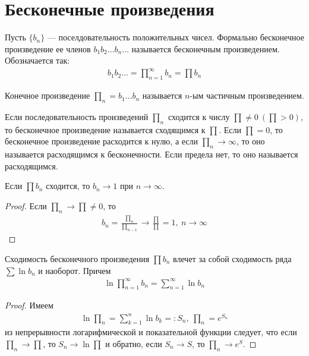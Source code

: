 \section{Бесконечные произведения}
\begin{definition}
  Пусть $\{b_n\}$ --- поселдовательность положительных чисел. Формально
  бесконечное произведение ее членов $b_1b_2\dots b_n\dots$ называется
  бесконечным произведением. Обозначается так:
  \begin{gather*}
    b_1b_2\dots = \prod\limits_{n = 1}^\infty b_n = \prod b_n
  \end{gather*}
\end{definition}

\begin{definition}
  Конечное произведение ${\prod}_n = b_1\dots b_n$ называется $n$-ым
  частичным произведением.
\end{definition}

\begin{definition}
  Если последовательность произведений ${\prod}_n$ сходится к числу $\prod \not =
  0 \ (\prod > 0)$, то бесконечное произведение называется сходящимся к
  $\prod$. Если $\prod = 0$, то бесконечное произведение расходится к нулю, а
  если $\prod_n \to \infty$, то оно называется расходящимся к бесконечности.
  Если предела нет, то оно называется расходящимся.
\end{definition}

\begin{approval}
  Если $\prod b_n$ сходится, то $b_n \to 1$ при $n \to \infty$.
\end{approval}

\begin{proof}
  Если $\prod_n \to \prod \not = 0$, то
  \begin{gather*}
    b_n = \frac{{\prod}_n}{{\prod}_{n-1}} \to
    \frac{\prod}{\prod} = 1, \ n \to \infty
  \end{gather*}
\end{proof}

\begin{approval}
  Сходимость бесконечного произведения $\prod b_n$ влечет за собой сходимость
  ряда $\sum \ln b_n$ и наоборот. Причем
  \begin{gather*}
    \ln \prod\limits_{n = 1}^\infty b_n = \sum\limits_{n = 1}^{\infty} \ln b_n
  \end{gather*}
\end{approval}

\begin{proof}
  Имеем
  \begin{gather}
    \ln {\prod}_n = \sum\limits_{k = 1}^{n} \ln b_k =: S_n, \ {\prod}_n = e^{S_n}
    \label{app912:eq1}
  \end{gather}
  из непрерывности логарифмической и показательной функции следует, что если
  ${\prod}_n \to \prod$, то $S_n \to \ln \prod$ и обратно, если $S_n \to S$, то
  ${\prod}_n \to e^{S}$.
\end{proof}

